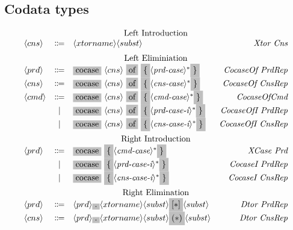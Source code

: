 \documentclass[11pt]{article}
\newcommand{\nonterminal}[1]{\langle #1 \rangle}
\newcommand{\terminal}[1]{\colorbox{lightgray}{#1}}
\begin{document}
\subsection{Codata types}
\[
  \begin{array}{lclr}
    \multicolumn{4}{c}{\text{Left Introduction}} \\
    \nonterminal{cns} & \Coloneqq & \nonterminal{xtorname}\nonterminal{subst} & \emph{Xtor Cns} \\[0.2cm]
    \multicolumn{4}{c}{\text{Left Eliminiation}} \\
    \nonterminal{prd} & \Coloneqq & \terminal{cocase}\ \nonterminal{cns}\ \terminal{of}\ \terminal{\{} \nonterminal{\textit{prd-case}}^{\ast} \terminal{\}} & \emph{CocaseOf PrdRep} \\
    \nonterminal{cns} & \Coloneqq & \terminal{cocase}\ \nonterminal{cns}\ \terminal{of}\ \terminal{\{} \nonterminal{\textit{cns-case}}^{\ast} \terminal{\}} & \emph{CocaseOf CnsRep} \\
    \nonterminal{cmd} & \Coloneqq & \terminal{cocase}\ \nonterminal{cns}\ \terminal{of}\ \terminal{\{} \nonterminal{\textit{cmd-case}}^{\ast} \terminal{\}} & \emph{CocaseOfCmd} \\
    & | & \terminal{cocase}\ \nonterminal{cns}\ \terminal{of}\ \terminal{\{} \nonterminal{\textit{prd-case-i}}^{\ast} \terminal{\}} & \emph{CocaseOfI PrdRep} \\
    & | & \terminal{cocase}\ \nonterminal{cns}\ \terminal{of}\ \terminal{\{} \nonterminal{\textit{cns-case-i}}^{\ast} \terminal{\}} & \emph{CocaseOfI CnsRep} \\[0.2cm]
    \multicolumn{4}{c}{\text{Right Introduction}} \\
    \nonterminal{prd} & \Coloneqq & \terminal{cocase}\ \terminal{\{} \nonterminal{\textit{cmd-case}}^{\ast} \terminal{\}} & \emph{XCase Prd} \\
    & | & \terminal{cocase}\ \terminal{\{} \nonterminal{\textit{prd-case-i}}^{\ast} \terminal{\}} & \emph{CocaseI PrdRep} \\
    & | & \terminal{cocase}\ \terminal{\{} \nonterminal{\textit{cns-case-i}}^{\ast} \terminal{\}} & \emph{CocaseI CnsRep} \\[0.2cm]
    \multicolumn{4}{c}{\text{Right Elimination}} \\
    \nonterminal{prd} & \Coloneqq & \nonterminal{prd}\terminal{.}\nonterminal{xtorname}\nonterminal{subst}\terminal{$[\ast]$}\nonterminal{subst} & \emph{Dtor PrdRep} \\
    \nonterminal{cns} & \Coloneqq & \nonterminal{prd}\terminal{.}\nonterminal{xtorname}\nonterminal{subst}\terminal{$(\ast)$}\nonterminal{subst} & \emph{Dtor CnsRep} \\
  \end{array}
\]
\end{document}

